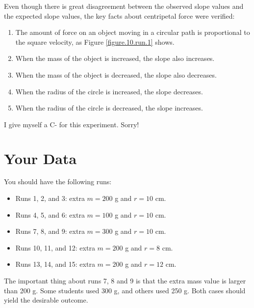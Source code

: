 Even though there is great disagreement between the observed slope values and the expected slope values, the key facts about centripetal force were verified:
\begin{enumerate}
    \item The amount of force on an object moving in a circular path is proportional to the square velocity, as Figure \ref{figure.10.run.1} shows.
    \item When the mass of the object is increased, the slope also increases.
    \item When the mass of the object is decreased, the slope also decreases.
    \item When the radius of the circle is increased, the slope decreases.
    \item When the radius of the circle is decreased, the slope increases.
\end{enumerate}
I give myself a C- for this experiment. Sorry!
%
\section{Your Data}
%
You should have the following runs:
\begin{itemize}
    \item Runs 1, 2, and 3: extra $m = 200$ g and $r = 10$ cm.
    \item Runs 4, 5, and 6: extra $m = 100$ g and $r = 10$ cm.
    \item Runs 7, 8, and 9: extra $m = 300$ g and $r = 10$ cm.
    \item Runs 10, 11, and 12: extra $m = 200$ g and $r = 8$ cm.
    \item Runs 13, 14, and 15: extra $m = 200$ g and $r = 12$ cm.
\end{itemize}
The important thing about runs 7, 8 and 9 is that the extra mass value is larger than 200 g. Some students used 300 g, and others used 250 g. Both cases should yield the desirable outcome.
%
\newpage
